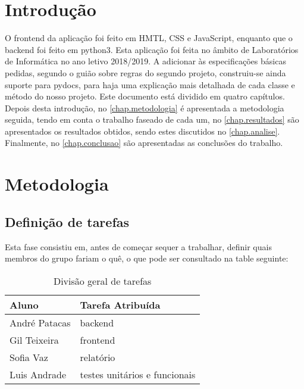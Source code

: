 \documentclass{report}
\begin{document}
\tableofcontents


\clearpage
{}

\chapter{Introdução}
\label{chap.introducao}

O frontend da aplicação foi feito em HMTL, CSS e JavaScript, enquanto que o backend foi feito em python3. Esta aplicação foi feita no âmbito de Laboratórios de Informática no ano letivo 2018/2019.
A adicionar às especificações básicas pedidas, segundo o guião sobre regras do segundo projeto, construiu-se ainda suporte para pydocs, para haja uma explicação mais detalhada de cada classe e método do nosso projeto.
Este documento está dividido em quatro capítulos.
Depois desta introdução,
no \autoref{chap.metodologia} é apresentada a metodologia seguida, tendo em conta o trabalho faseado de cada um, 
no \autoref{chap.resultados} são apresentados os resultados obtidos,
sendo estes discutidos no \autoref{chap.analise}.
Finalmente, no \autoref{chap.conclusao} são apresentadas
as conclusões do trabalho.

\chapter{Metodologia}
\label{chap.metodologia}
\section{Definição de tarefas}
Esta fase consistiu em, antes de começar sequer a trabalhar, definir quais membros do grupo fariam o quê, o que pode ser consultado na table seguinte: 
\begin{table}[h!]
\begin{center}
\caption{Divisão geral de tarefas}
\label{tab:table1}
\begin{tabular}{l|l}
\hline
\multicolumn{1}{|l|}{Aluno} & \multicolumn{1}{l|}{Tarefa Atribuída} \\ \hline
            André Patacas   & backend                               \\ 
            Gil Teixeira      & frontend                               \\
            Sofia Vaz         & relatório                                \\
            Luis Andrade    & testes unitários e funcionais                     
\end{tabular}
\end{center}
\end{table}
\end{document}
